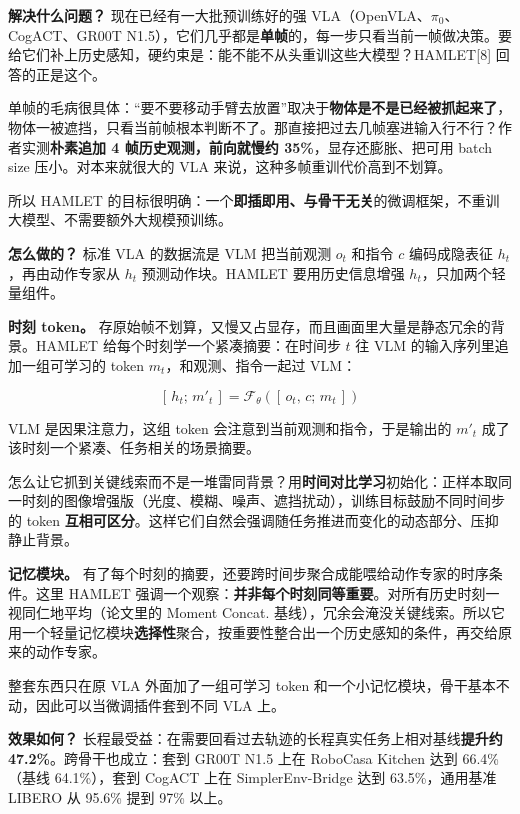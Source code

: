 \documentclass[
  chinese,
]{ctexart}
\begin{document}
\textbf{解决什么问题？} 现在已经有一大批预训练好的强
VLA（OpenVLA、\(\pi_0\)、CogACT、GR00T
N1.5），它们几乎都是\textbf{单帧}的，每一步只看当前一帧做决策。要给它们补上历史感知，硬约束是：能不能不从头重训这些大模型？HAMLET{[}8{]}
回答的正是这个。

单帧的毛病很具体：``要不要移动手臂去放置''取决于\textbf{物体是不是已经被抓起来了}，物体一被遮挡，只看当前帧根本判断不了。那直接把过去几帧塞进输入行不行？作者实测\textbf{朴素追加
4 帧历史观测，前向就慢约 35\%}，显存还膨胀、把可用 batch size
压小。对本来就很大的 VLA 来说，这种多帧重训代价高到不划算。

所以 HAMLET
的目标很明确：一个\textbf{即插即用、与骨干无关}的微调框架，不重训大模型、不需要额外大规模预训练。

\textbf{怎么做的？} 标准 VLA 的数据流是 VLM 把当前观测 \(o_t\) 和指令
\(c\) 编码成隐表征 \(h_t\)，再由动作专家从 \(h_t\) 预测动作块。HAMLET
要用历史信息增强 \(h_t\)，只加两个轻量组件。

\textbf{时刻 token。}
存原始帧不划算，又慢又占显存，而且画面里大量是静态冗余的背景。HAMLET
给每个时刻学一个紧凑摘要：在时间步 \(t\) 往 VLM
的输入序列里追加一组可学习的 token \(m_t\)，和观测、指令一起过 VLM：

\[[\,h_t;\, m'_t\,] = \mathcal{F}_\theta([\,o_t,\, c;\, m_t\,])\]

VLM 是因果注意力，这组 token 会注意到当前观测和指令，于是输出的 \(m'_t\)
成了该时刻一个紧凑、任务相关的场景摘要。

怎么让它抓到关键线索而不是一堆雷同背景？用\textbf{时间对比学习}初始化：正样本取同一时刻的图像增强版（光度、模糊、噪声、遮挡扰动），训练目标鼓励不同时间步的
token
\textbf{互相可区分}。这样它们自然会强调随任务推进而变化的动态部分、压抑静止背景。

\textbf{记忆模块。}
有了每个时刻的摘要，还要跨时间步聚合成能喂给动作专家的时序条件。这里
HAMLET
强调一个观察：\textbf{并非每个时刻同等重要}。对所有历史时刻一视同仁地平均（论文里的
Moment Concat.
基线），冗余会淹没关键线索。所以它用一个轻量记忆模块\textbf{选择性}聚合，按重要性整合出一个历史感知的条件，再交给原来的动作专家。

整套东西只在原 VLA 外面加了一组可学习 token
和一个小记忆模块，骨干基本不动，因此可以当微调插件套到不同 VLA 上。

\textbf{效果如何？}
长程最受益：在需要回看过去轨迹的长程真实任务上相对基线\textbf{提升约
47.2\%}。跨骨干也成立：套到 GR00T N1.5 上在 RoboCasa Kitchen 达到
66.4\%（基线 64.1\%），套到 CogACT 上在 SimplerEnv-Bridge 达到
63.5\%，通用基准 LIBERO 从 95.6\% 提到 97\% 以上。
\end{document}
